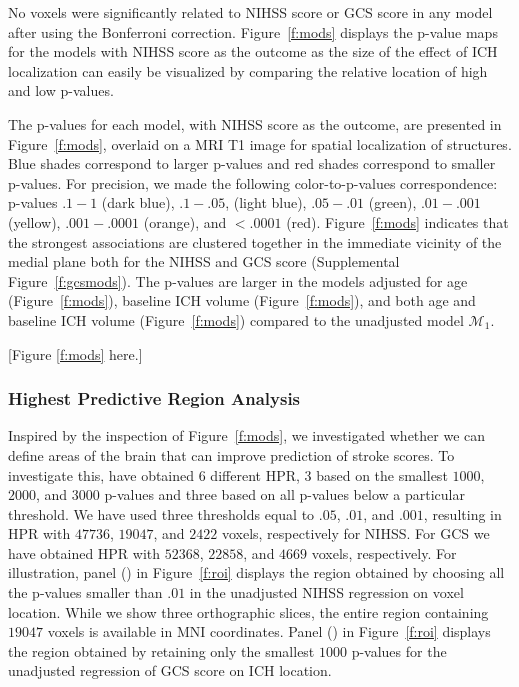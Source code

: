 \documentclass[10pt]{article}\usepackage[]{graphicx}\usepackage[]{color}
\begin{document}
No voxels were significantly related to NIHSS score or GCS score in any model after using the Bonferroni correction.  Figure~\ref{f:mods} displays the p-value maps for the models with NIHSS score as the outcome as the size of the effect of ICH localization can easily be visualized by comparing the relative location of high and low p-values. 

The p-values for each model, with NIHSS score as the outcome, are presented in Figure~\ref{f:mods}, overlaid on a MRI T1 image for spatial localization of structures.  Blue shades correspond to larger p-values and red shades correspond to smaller p-values.  For precision, we made the following color-to-p-values correspondence: p-values $.1-1$ (dark blue), $.1-.05$, (light blue), $.05-.01$ (green), $.01-.001$ (yellow),  $.001-.0001$ (orange), and $< .0001$ (red).  Figure~\ref{f:mods} indicates that the strongest associations are clustered together in the immediate vicinity of the medial plane both for the NIHSS and GCS score (Supplemental Figure~\ref{f:gcsmods}).  The p-values are larger in the models adjusted for age (Figure~\ref{f:mods}\protect{}), baseline ICH volume (Figure~\ref{f:mods}\protect{}), and both age and baseline ICH volume (Figure~\ref{f:mods}\protect{}) compared to the unadjusted model $\mathcal{M}_1$.  

[Figure \ref{f:mods} here.]

\subsubsection{Highest Predictive Region Analysis}






Inspired by the inspection of Figure~\ref{f:mods}, we investigated whether we can define areas of the brain that can improve prediction of stroke scores. To investigate this, have obtained 6 different HPR, 3 based on the smallest $1000$, $2000$, and $3000$ p-values and three based on all p-values below a particular threshold. We have used three thresholds equal to $.05$, $.01$, and $.001$, resulting in HPR with $47736$, $19047$, and $2422$ voxels, respectively for NIHSS. 
For GCS we have obtained HPR with $52368$, $22858$, and $4669$ voxels, respectively. For illustration, panel (\protect{}) in Figure~\ref{f:roi} displays the region obtained by choosing all the p-values smaller than $.01$ in the unadjusted NIHSS regression on voxel location.  While we show three orthographic slices, the entire region containing $19047$ voxels is available in MNI coordinates. Panel (\protect{}) in Figure~\ref{f:roi} displays the region obtained by retaining only the smallest $1000$ p-values for the unadjusted regression of GCS score on ICH location. 
\end{document}
